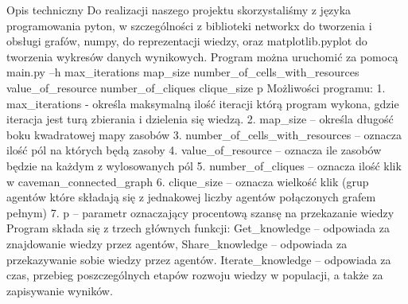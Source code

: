 Opis techniczny
Do realizacji naszego projektu skorzystaliśmy z języka programowania pyton, w szczególności z biblioteki networkx do tworzenia i obsługi grafów, numpy, do reprezentacji wiedzy, oraz matplotlib.pyplot do tworzenia wykresów danych wynikowych.
Program można uruchomić za pomocą main.py –h max_iterations map_size number_of_cells_with_resources value_of_resource  number_of_cliques  clique_size p 
Możliwości programu:
1. max_iterations - określa maksymalną ilość iteracji którą program wykona, gdzie iteracja jest turą zbierania i dzielenia się wiedzą.
2. map_size – określa długość boku kwadratowej mapy zasobów
3. number_of_cells_with_resources – oznacza ilość pól na których będą zasoby
4. value_of_resource – oznacza ile zasobów będzie na każdym z wylosowanych pól
5. number_of_cliques – oznacza ilość klik w caveman_connected_graph
6. clique_size – oznacza wielkość klik (grup agentów które składają się z jednakowej liczby agentów połączonych grafem pełnym)
7. p – parametr oznaczający procentową szansę na przekazanie wiedzy
Program składa się z trzech głównych funkcji:
Get_knowledge – odpowiada za znajdowanie wiedzy przez agentów,
Share_knowledge – odpowiada za przekazywanie sobie wiedzy przez agentów.
Iterate_knowledge – odpowiada za czas, przebieg poszczególnych etapów rozwoju wiedzy w populacji, a także za zapisywanie wyników.
